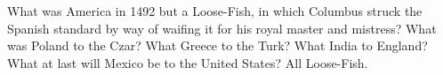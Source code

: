 
What was America in 1492 but a Loose-Fish, in which Columbus struck the Spanish
standard by way of waifing it for his royal master and mistress? What was Poland
to the Czar? What Greece to the Turk? What India to England? What at last will
Mexico be to the United States? All Loose-Fish.

